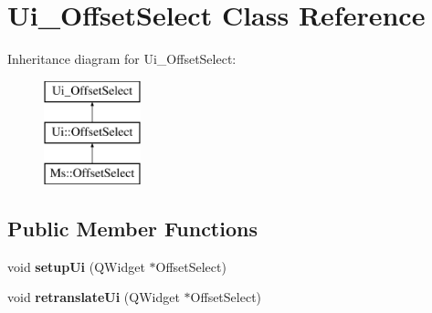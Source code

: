 \hypertarget{class_ui___offset_select}{}\section{Ui\+\_\+\+Offset\+Select Class Reference}
\label{class_ui___offset_select}
Inheritance diagram for Ui\+\_\+\+Offset\+Select\+:\begin{figure}[H]
\begin{center}
\leavevmode
\includegraphics[height=3.000000cm]{class_ui___offset_select}
\end{center}
\end{figure}
\subsection*{Public Member Functions}
\begin{DoxyCompactItemize}
\item 
\mbox{\label{class_ui___offset_select_a46aff830bee06c8174a03fcf241bbfbc}} 
void {\bfseries setup\+Ui} (Q\+Widget $\ast$Offset\+Select)
\item 
\mbox{\label{class_ui___offset_select_a085e2fc959508cd812e1ccc053530634}} 
void {\bfseries retranslate\+Ui} (Q\+Widget $\ast$Offset\+Select)
\end{DoxyCompactItemize}
